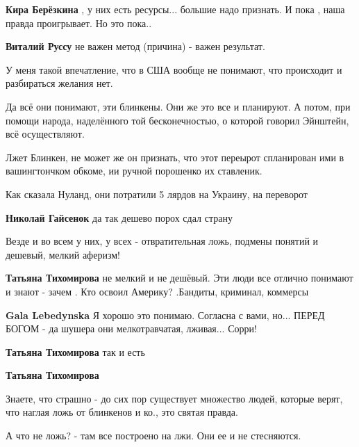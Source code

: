 \begin{itemize}
\begin{itemize}
\textbf{Кира Берёзкина} , у них есть ресурсы... большие надо признать.
И пока , наша правда проигрывает.
Но это пока..

\textbf{Виталий Руссу} не важен метод (причина) - важен результат.
\end{itemize} %

У меня такой впечатление, что в США вообще не понимают, что происходит и
разбираться желания нет.


Да всё они понимают, эти блинкены. Они же это все и планируют. А потом, при
помощи народа, наделённого той бесконечностью, о которой говорил Эйнштейн, всё
осуществляют.


Лжет Блинкен, не может же он признать, что этот переырот спланирован ими в
вашингтончком обкоме, ии ручной порошенко их ставленик.

\begin{itemize} %
Как сказала Нуланд, они потратили 5 лярдов на Украину, на переворот

\textbf{Николай Гайсенок} да так дешево порох сдал страну
\end{itemize} %


Везде и во всем у них, у всех - отвратительная ложь, подмены понятий и дешевый,
мелкий аферизм!

\begin{itemize} %
\textbf{Татьяна Тихомирова} не мелкий и не дешёвый. Эти люди все отлично понимают и знают - зачем . Кто освоил Америку? .Бандиты, криминал, коммерсы

\textbf{Gala Lebedynska} Я хорошо это понимаю. Согласна с вами, но... ПЕРЕД БОГОМ - да шушера они мелкотравчатая, лживая... Сорри!

\textbf{Татьяна Тихомирова} так и есть

\textbf{Татьяна Тихомирова}

\end{itemize} %


Знаете, что страшно - до сих пор существует множество людей, которые верят, что
наглая ложь от блинкенов и ко., это святая правда.


А что не ложь? - там все построено на лжи. Они ее и не стесняются.


\end{itemize}
